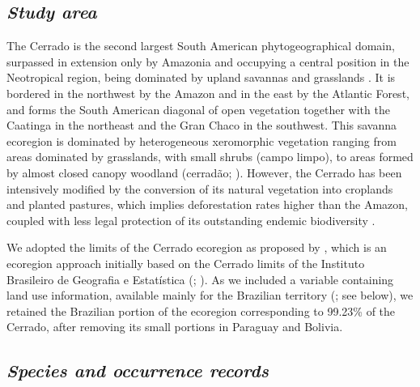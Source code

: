 \documentclass[12pt,openright,oneside,a4paper,english]{abntex2}
\begin{document}
\subsection{\textit{Study area}}

The Cerrado is the second largest South American phytogeographical domain, surpassed in extension only by Amazonia and occupying a central position in the Neotropical region, being dominated by upland savannas and grasslands \citep{Absaber1998}. It is bordered in the northwest by the Amazon and in the east by the Atlantic Forest, and forms the South American diagonal of open vegetation together with the Caatinga in the northeast and the Gran Chaco in the southwest. This savanna ecoregion is dominated by heterogeneous xeromorphic vegetation ranging from areas dominated by grasslands, with small shrubs (campo limpo), to areas formed by almost closed canopy woodland (cerradão; \citealp{Eiten1972, Ratter1997}). However, the Cerrado has been intensively modified by the conversion of its natural vegetation into croplands and planted pastures, which implies deforestation rates higher than the Amazon, coupled with less legal protection of its outstanding endemic biodiversity \citep{Strassburg2017}.

We adopted the limits of the Cerrado ecoregion as proposed by \citet{Dinerstein2017}, which is an ecoregion approach initially based on the Cerrado limits of the Instituto Brasileiro de Geografia e Estatística (\citealp{IBGE1993}; \citealp[see][]{Olson2001}). As we included a variable containing land use information, available mainly for the Brazilian territory (\citealp{MapBiomas2022}; see below), we retained the Brazilian portion of the ecoregion corresponding to 99.23\% of the Cerrado, after removing its small portions in Paraguay and Bolivia.

\subsection{\textit{Species and occurrence records}}
\end{document}
